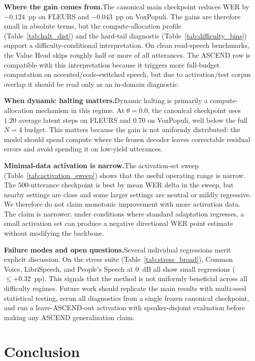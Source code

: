 \documentclass[a4paper]{article}
\begin{document}
\textbf{Where the gain comes from.}\quad The canonical main checkpoint reduces WER by $-0.124$~pp on FLEURS and $-0.043$~pp on VoxPopuli. The gains are therefore small in absolute terms, but the compute-allocation profile (Table~\ref{tab:halt_dist}) and the hard-tail diagnostic (Table~\ref{tab:difficulty_bins}) support a difficulty-conditional interpretation. On clean read-speech benchmarks, the Value Head skips roughly half or more of all utterances. The ASCEND row is compatible with this interpretation because it triggers more full-budget computation on accented/code-switched speech, but due to activation/test corpus overlap it should be read only as an in-domain diagnostic.

\textbf{When dynamic halting matters.}\quad Dynamic halting is primarily a compute-allocation mechanism in this regime. At $\theta{=}0.0$, the canonical checkpoint uses $1.20$ average latent steps on FLEURS and $0.70$ on VoxPopuli, well below the full $N{=}4$ budget. This matters because the gain is not uniformly distributed: the model should spend compute where the frozen decoder leaves correctable residual errors and avoid spending it on low-yield utterances.

\textbf{Minimal-data activation is narrow.}\quad The activation-set sweep (Table~\ref{tab:activation_sweep}) shows that the useful operating range is narrow. The 500-utterance checkpoint is best by mean WER delta in the sweep, but nearby settings are close and some larger settings are neutral or mildly regressive. We therefore do not claim monotonic improvement with more activation data. The claim is narrower: under conditions where standard adaptation regresses, a small activation set can produce a negative directional WER point estimate without modifying the backbone.

\textbf{Failure modes and open questions.}\quad Several individual regressions merit explicit discussion. On the stress suite (Table~\ref{tab:stress_broad}), Common Voice, LibriSpeech, and People's Speech at $0$~dB all show small regressions ($\leq +0.32$~pp). This signals that the method is not uniformly beneficial across all difficulty regimes. Future work should replicate the main results with multi-seed statistical testing, rerun all diagnostics from a single frozen canonical checkpoint, and run a leave-ASCEND-out activation with speaker-disjoint evaluation before making any ASCEND generalization claim.

\section{Conclusion}
\label{sec:conclusion}
\end{document}

